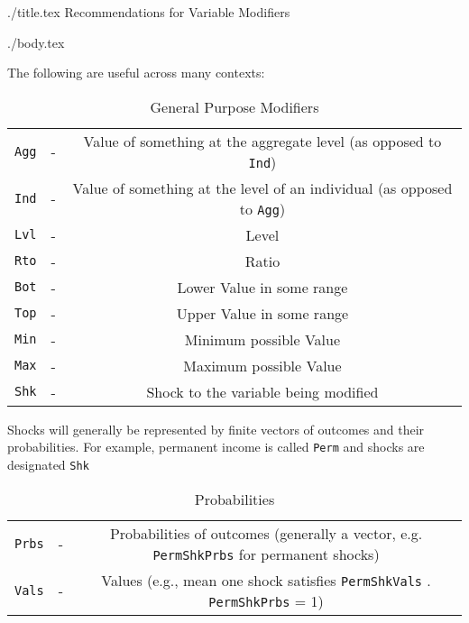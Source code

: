 \documentclass[12pt]{econtex}
\begin{document}
\begin{verbatimwrite}{./title.tex}
Recommendations for Variable Modifiers
\end{verbatimwrite}

\title{}

\date{\today}
\maketitle 

\begin{verbatimwrite}{./body.tex}

The following are useful across many contexts:
\begin{table}[h]
	\centering
	\begin{tabular}{||>{\ttfamily}ccc||} 		
		\hline
   \texttt{Agg} & - & Value of something at the aggregate level (as opposed to \texttt{Ind})
\\ \texttt{Ind} & - & Value of something at the level of an individual (as opposed to \texttt{Agg})
\\ \texttt{Lvl} & - & Level 
\\ \texttt{Rto} & - & Ratio 
\\ \texttt{Bot} & - & Lower Value in some range 
\\ \texttt{Top} & - & Upper Value in some range 
\\ \texttt{Min} & - & Minimum possible Value 
\\ \texttt{Max} & - & Maximum possible Value 
\\ \texttt{Shk} & - & Shock to the variable being modified 
\\ 	\hline
	\end{tabular}
	\caption{General Purpose Modifiers}
	\label{table:General}
\end{table}	

Shocks will generally be represented by finite vectors of outcomes and their probabilities.  For example, permanent income is called \texttt{Perm} and shocks are designated \texttt{Shk} 
\begin{table}[h]
	\centering
	\begin{tabular}{||>{\ttfamily}ccc||} 		
		\hline
\texttt{Prbs} & - & Probabilities of outcomes (generally a vector, e.g. \texttt{PermShkPrbs} for permanent shocks) 
\\ \texttt{Vals} & - & Values (e.g., mean one shock satisfies \texttt{PermShkVals} . \texttt{PermShkPrbs} = 1) 
\\ 	\hline
	\end{tabular}
	\caption{Probabilities}
	\label{table:Probabilities}
\end{table}	




\end{verbatimwrite}
\end{document}
